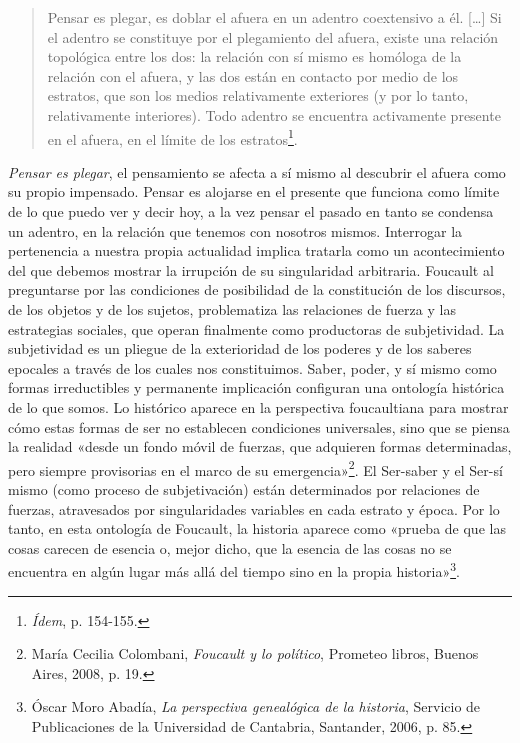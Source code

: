 \begin{quote}
Pensar es plegar, es doblar el afuera en un adentro coextensivo a él. {[}\ldots{]} Si el adentro se constituye por el plegamiento del afuera, existe una relación topológica entre los dos: la relación con sí mismo es homóloga de la relación con el afuera, y las dos están en contacto por medio de los estratos, que son los medios relativamente exteriores (y por lo tanto, relativamente interiores). Todo adentro se encuentra activamente presente en el afuera, en el límite de los estratos\footnote{\emph{Ídem}, p. 154-155.}.
\end{quote}

\emph{Pensar es plegar}, el pensamiento se afecta a sí mismo al descubrir el afuera como su propio impensado. Pensar es alojarse en el presente que funciona como límite de lo que puedo ver y decir hoy, a la vez pensar el pasado en tanto se condensa un adentro, en la relación que tenemos con nosotros mismos. Interrogar la pertenencia a nuestra propia actualidad implica tratarla como un acontecimiento del que debemos mostrar la irrupción de su singularidad arbitraria. Foucault al preguntarse por las condiciones de posibilidad de la constitución de los discursos, de los objetos y de los sujetos, problematiza las relaciones de fuerza y las estrategias sociales, que operan finalmente como productoras de subjetividad. La subjetividad es un pliegue de la exterioridad de los poderes y de los saberes epocales a través de los cuales nos constituimos. Saber, poder, y sí mismo como formas irreductibles y permanente implicación configuran una ontología histórica de lo que somos. Lo histórico aparece en la perspectiva foucaultiana para mostrar cómo estas formas de ser no establecen condiciones universales, sino que se piensa la realidad «desde un fondo móvil de fuerzas, que adquieren formas determinadas, pero siempre provisorias en el marco de su emergencia»\footnote{María Cecilia Colombani, \emph{Foucault y lo político}, Prometeo libros, Buenos Aires, 2008, p. 19.}. El Ser-saber y el Ser-sí mismo (como proceso de subjetivación) están determinados por relaciones de fuerzas, atravesados por singularidades variables en cada estrato y época. Por lo tanto, en esta ontología de Foucault, la historia aparece como «prueba de que las cosas carecen de esencia o, mejor dicho, que la esencia de las cosas no se encuentra en algún lugar más allá del tiempo sino en la propia historia»\footnote{Óscar Moro Abadía, \emph{La perspectiva genealógica de la historia}, Servicio de Publicaciones de la Universidad de Cantabria, Santander, 2006, p. 85.}.

